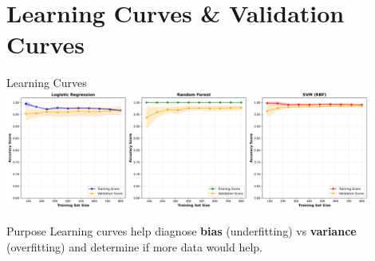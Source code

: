 \documentclass[8pt,aspectratio=1610]{beamer}
\begin{document}

\section{Learning Curves \& Validation Curves}

\begin{frame}{Learning Curves}
\centering
\includegraphics[width=0.9\textwidth]{../figures/learning_curves_cv.png}

\vspace{0.3cm}

\begin{alertblock}{Purpose}
Learning curves help diagnose \textbf{bias} (underfitting) vs \textbf{variance} (overfitting) and determine if more data would help.
\end{alertblock}
\end{frame}
\end{document}
